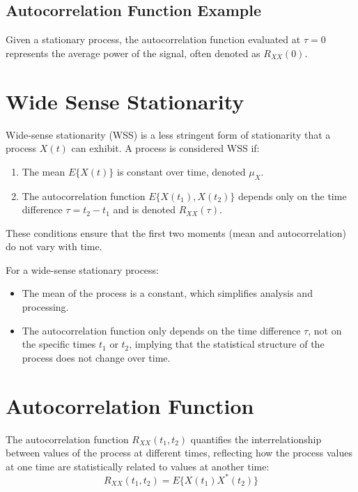 \subsection*{Autocorrelation Function Example}
Given a stationary process, the autocorrelation function evaluated at \( \tau = 0 \) represents the average power of the signal, often denoted as \( R_{XX}(0) \).


\section*{Wide Sense Stationarity}

Wide-sense stationarity (WSS) is a less stringent form of stationarity that a process \( X(t) \) can exhibit. A process is considered WSS if:
\begin{enumerate}
    \item The mean \( E\{X(t)\} \) is constant over time, denoted \( \mu_X \).
    \item The autocorrelation function \( E\{X(t_1),X(t_2)\} \) depends only on the time difference \( \tau = t_2 - t_1 \) and is denoted \( R_{XX}(\tau) \).
\end{enumerate}
These conditions ensure that the first two moments (mean and autocorrelation) do not vary with time.

For a wide-sense stationary process:
\begin{itemize}
    \item The mean of the process is a constant, which simplifies analysis and processing.
    \item The autocorrelation function only depends on the time difference \( \tau \), not on the specific times \( t_1 \) or \( t_2 \), implying that the statistical structure of the process does not change over time.
\end{itemize}

\section*{Autocorrelation Function}

The autocorrelation function \( R_{XX}(t_1, t_2) \) quantifies the interrelationship between values of the process at different times, reflecting how the process values at one time are statistically related to values at another time:
\[ R_{XX}(t_1, t_2) = E\{X(t_1)X^*(t_2)\} \]


